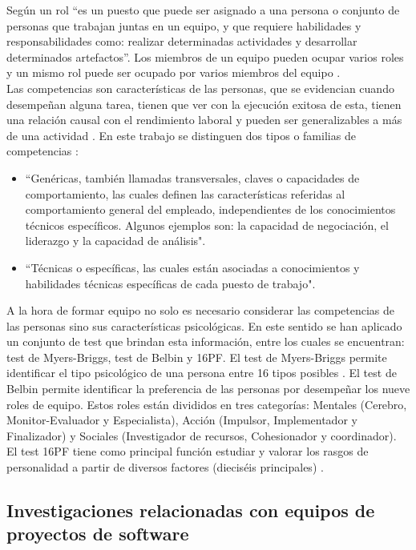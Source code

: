 Según \cite{64} un rol “es un puesto que puede ser asignado a una persona o conjunto de personas que trabajan juntas en un equipo, y que requiere habilidades y responsabilidades como: realizar determinadas actividades y desarrollar determinados artefactos”. Los miembros de un equipo pueden ocupar varios roles y un mismo rol puede ser ocupado por varios miembros del equipo \citep{Mayi09}.\\

Las competencias son características de las personas, que se evidencian cuando desempeñan alguna tarea, tienen que ver con la ejecución exitosa de esta, tienen una relación causal con el rendimiento laboral y pueden ser generalizables a más de una actividad \cite{Boyatzis1982}. En este trabajo se distinguen dos tipos o familias de competencias \citep{Mayi09, 76}:
\begin{itemize}
	\item  ``Genéricas, también llamadas transversales, claves o capacidades de comportamiento, las cuales definen las características referidas al comportamiento general del empleado, independientes de los conocimientos técnicos específicos. Algunos ejemplos son: la capacidad de negociación, el liderazgo y la capacidad de análisis".
	\item  ``Técnicas o específicas, las cuales están asociadas a conocimientos y habilidades técnicas específicas de cada puesto de trabajo".
\end{itemize}

\color{red}
A la hora de formar equipo no solo es necesario considerar las competencias de las personas sino sus características psicológicas. En este sentido se han aplicado un conjunto de test que brindan esta información, entre los cuales se encuentran: test de Myers-Briggs, test de Belbin y 16PF. El test de Myers-Briggs permite identificar el tipo psicológico de una persona entre 16 tipos posibles \citep{117, 119}. El test de Belbin permite identificar la preferencia de las personas por desempeñar los nueve roles de equipo. Estos roles están divididos en tres categorías: Mentales (Cerebro, Monitor-Evaluador y Especialista), Acción (Impulsor, Implementador y Finalizador) y Sociales (Investigador de recursos, Cohesionador y coordinador). El test 16PF tiene como principal función estudiar y valorar los rasgos de personalidad a partir de diversos factores (dieciséis principales) \citep{118}.
\normalcolor	
\subsection{Investigaciones relacionadas con equipos de proyectos de software}

